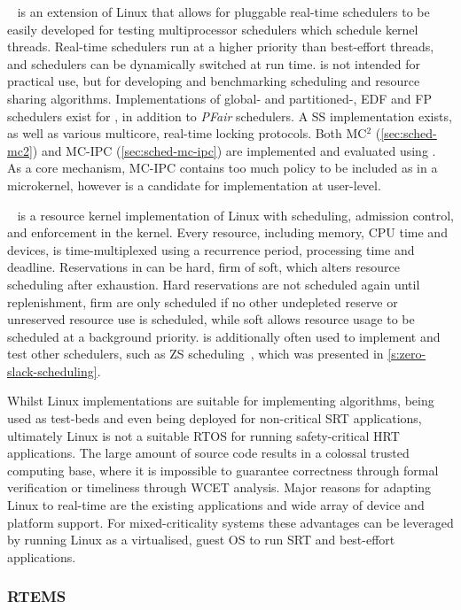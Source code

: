 \litmus~\citep{Calandrino_LBDA_06} is an extension of Linux that allows for pluggable real-time
schedulers to be easily developed for testing multiprocessor schedulers which schedule kernel
threads. Real-time schedulers run at a higher priority than best-effort threads, and schedulers can
be dynamically switched at run time. \litmus is not intended for
practical use, but for developing and benchmarking scheduling and resource sharing algorithms.
Implementations of global- and partitioned-, EDF and FP schedulers exist for \litmus, in addition to
\emph{PFair} schedulers. A \gls{SS} implementation exists, as well as various multicore,
real-time locking protocols.
Both MC$^2$ (\cref{sec:sched-mc2}) and MC-IPC (\cref{sec:sched-mc-ipc}) are implemented
and evaluated using \litmus. As a core mechanism, MC-IPC contains too much policy to be included as
in a microkernel, however is a candidate for implementation at user-level.

\linuxrk~\citep{Oikawa_Rajkumar_98} is a resource kernel implementation of Linux with scheduling,
admission control, and enforcement in the kernel. Every resource, including memory, CPU time and
devices, is 
time-multiplexed using a recurrence period, processing time and deadline. Reservations in \linuxrk
can be hard, firm of soft, which alters resource scheduling after exhaustion. Hard
reservations are not scheduled again until replenishment, firm are only scheduled if no other
undepleted reserve or unreserved resource use is scheduled, while soft allows resource usage to be
scheduled at a background priority. \linuxrk is additionally often used to implement and test other
schedulers, such as \Gls{ZS} scheduling~\citep{deNiz_LR_09}, which was presented in
\cref{s:zero-slack-scheduling}.
 
Whilst Linux implementations are suitable for implementing algorithms, being used as test-beds and
even being deployed for non-critical \gls{SRT} applications, ultimately Linux is not a suitable
\gls{RTOS} for running safety-critical \gls{HRT} applications. The large amount of source code
results in a colossal trusted computing base, where it is impossible to guarantee correctness through
formal verification or timeliness through {\gls{WCET}} analysis.  Major reasons for adapting Linux
to real-time are the existing applications and wide array of device and platform support. For
mixed-criticality systems these advantages can be leveraged by running Linux as a virtualised, guest \gls{OS} to run \gls{SRT}
and best-effort applications.

\subsubsection{RTEMS}

